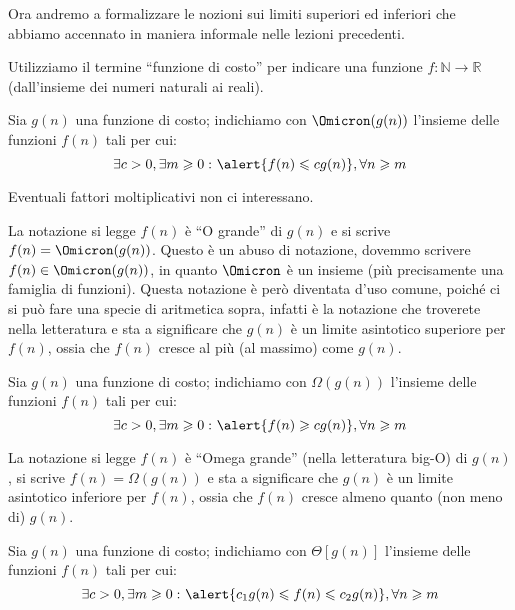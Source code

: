 Ora andremo a formalizzare le nozioni sui limiti superiori ed inferiori che abbiamo accennato in maniera informale nelle lezioni precedenti.

\begin{definition}
Utilizziamo il termine \enquote{funzione di costo} per indicare una funzione \(f\colon\mathbb{N}\to\mathbb{R}\) (dall'insieme dei numeri naturali ai reali).
\end{definition}

\begin{definition}
Sia \(g(n)\) una funzione di costo; indichiamo con \(\Omicron(g(n))\) l'insieme delle funzioni \(f(n)\) tali per cui:
\[
	\exists c > 0, \exists m \geqslant 0\,\colon \alert{f(n) \leqslant cg(n)}, \forall n \geqslant m\]
\end{definition}

\begin{note}
Eventuali fattori moltiplicativi non ci interessano.
\end{note}

La notazione si legge \(f(n)\) è \enquote{O grande} di \(g(n)\) e si scrive \(f(n) = \Omicron(g(n))\).
Questo è un abuso di notazione, dovemmo scrivere \(f(n) \in \Omicron(g(n))\), in quanto \(\Omicron\) è un insieme (più precisamente una famiglia di funzioni).
Questa notazione è però diventata d'uso comune, poiché ci si può fare una specie di aritmetica sopra, infatti è la notazione che troverete nella letteratura e sta a significare che \(g(n)\) è un limite asintotico superiore per \(f(n)\), ossia che \(f(n)\) cresce al più (al massimo) come \(g(n)\).

\begin{definition}
Sia \(g(n)\) una funzione di costo; indichiamo con \(\Omega(g(n))\) l'insieme delle funzioni \(f(n)\) tali per cui:
\[
	\exists c > 0, \exists m \geqslant 0\,\colon \alert{f(n) \geqslant cg(n)}, \forall n \geqslant m
\]
\end{definition}

La notazione si legge \(f(n)\) è \enquote{Omega grande} (nella letteratura big-O) di \(g(n)\), si scrive \(f(n) = \Omega(g(n))\) e sta a significare che \(g(n)\) è un limite asintotico inferiore per \(f(n)\), ossia che \(f(n)\) cresce almeno quanto (non meno di) \(g(n)\).

\begin{definition}
Sia \(g(n)\) una funzione di costo; indichiamo con \(\Theta[g(n)]\) l'insieme delle funzioni \(f(n)\) tali per cui:
\[
	\exists c > 0, \exists m \geqslant 0\,\colon \alert{c_1g(n) \leqslant f(n) \leqslant c_2g(n)}, \forall n \geqslant m
\]
\end{definition}

